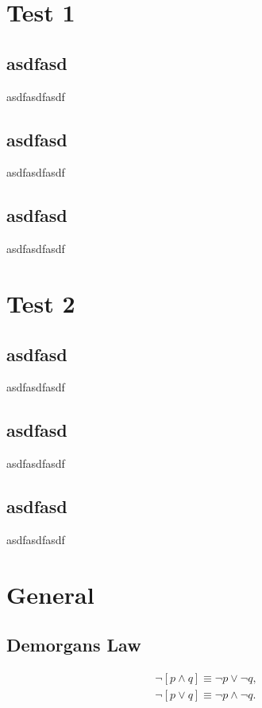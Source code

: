\documentclass[10pt]{article}
\begin{document}
\begin{multicols}{3}

    \section*{Test 1}
    \subsection*{asdfasd}
    asdfasdfasdf
    \subsection*{asdfasd}
    asdfasdfasdf
    \subsection*{asdfasd}
    asdfasdfasdf

    \section*{Test 2}
    \subsection*{asdfasd}
    asdfasdfasdf
    \subsection*{asdfasd}
    asdfasdfasdf
    \subsection*{asdfasd}
    asdfasdfasdf

    \section*{General}
    \subsection*{Demorgans Law}
    \begin{align}
        \neg[p\wedge q]\equiv\neg p\vee\neg q,\\
        \neg[p\vee q]\equiv\neg p\wedge\neg q.
    \end{align}


\end{multicols}
\end{document}
